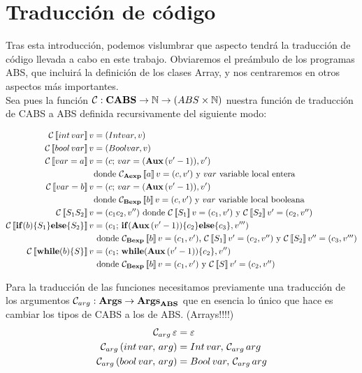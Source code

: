 \section{Traducción de código}

Tras esta introducción, podemos vislumbrar que aspecto tendrá la traducción de código llevada a cabo en este trabajo. Obviaremos el preámbulo de los programas ABS, que incluirá la definición de los clases Array, y nos centraremos en otros aspectos más importantes.\\

Sea pues la función $\C: \CABS \rightarrow \Nat \rightarrow (ABS \times \Nat)$ nuestra función de traducción de CABS a ABS definida recursivamente del siguiente modo:

\begin{align*}
  \C\eval{int\, var} v &= (Int var, v) \\
  \C\eval{bool\, var} v &= (Bool var, v) \\
  \C\eval{var = a} v &= (c\; var = (\Aux\, (v' - 1)), v') \\
  & \mbox{donde $\C_\AExp\eval{a} v = (c, v')$ y $var$ variable local entera} \\
  \C\eval{var = b} v &= (c\; var = (\Aux\, (v' - 1)), v') \\
  & \mbox{donde $\C_\BExp\eval{b} v = (c, v')$ y $var$ variable local booleana} \\
  \C\eval{S_1 S_2} v &= (c_1 c_2, v'') \mbox{ donde $\C\eval{S_1} v = (c_1, v')$ y $\C\eval{S_2} v' = (c_2, v'')$} \\
  \C\eval{\If{b}{S_1}{S_2}} v &= (c_1\; \If{\Aux\, (v' - 1)}{c_2}{c_3}, v''') \\
  & \mbox{ donde $\C_\BExp\eval{b} v = (c_1, v')$, $\C\eval{S_1} v' = (c_2, v'')$ y $\C\eval{S_2} v'' = (c_3, v''')$} \\
  \C\eval{\while{b}{S}} v &= (c_1\; \while{\Aux\, (v' - 1)}{c_2}, v'') \\
  & \mbox{ donde $\C_\BExp\eval{b} v = (c_1, v')$ y $\C\eval{S} v' = (c_2, v'')$}
\end{align*}

Para la traducción de las funciones necesitamos previamente una traducción de los argumentos $\C_{arg}: \Args \rightarrow \Args_\ABS$ que en esencia lo único que hace es cambiar los tipos de CABS a los de ABS. (Arrays!!!!)
\begin{align*}
  \C_{arg}\,\varepsilon &= \varepsilon\\
  \C_{arg}\, (int \, var,\,arg) &= Int\,var,\,\C_{arg}\, arg\\
  \C_{arg}\, (bool \, var,\,arg) &= Bool\,var,\,\C_{arg}\, arg
\end{align*}

